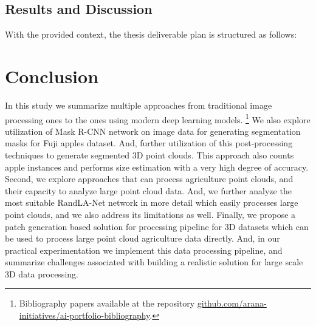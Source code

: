 \documentclass{article}
\begin{document}
\subsection{Results and Discussion}
With the provided context, the thesis deliverable plan is structured as follows:
\fi


\section{Conclusion}


In this study we summarize multiple approaches from traditional image processing ones to the ones using modern deep learning models. \footnote{ Bibliography papers available at the repository \href{https://github.com/arana-initiatives/ai-portfolio-bibliography}{github.com/arana-initiatives/ai-portfolio-bibliography}.}
We also explore utilization of Mask R-CNN network on image data for generating segmentation masks for Fuji apples dataset.
And, further utilization of this post-processing techniques to generate segmented 3D point clouds.
This approach also counts apple instances and performs size estimation with a very high degree of accuracy.
Second, we explore approaches that can process agriculture point clouds, and their capacity to analyze large point cloud data.
And, we further analyze the most suitable RandLA-Net network in more detail which easily processes large point clouds, and we also address its limitations as well.
Finally, we propose a patch generation based solution for processing pipeline for 3D datasets which can be used to process large point cloud agriculture data directly.
And, in our practical experimentation we implement this data processing pipeline, and summarize challenges associated with building a realistic solution for large scale 3D data processing.




\end{document}
